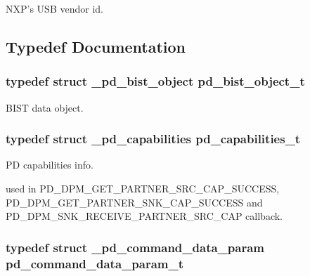 N\-X\-P's U\-S\-B vendor id. 



\subsection{Typedef Documentation}
\hypertarget{group__usb__pd__stack_ga812b5b90f650b07ee49c5ec4d2e24ebc}{
\subsubsection[{pd\-\_\-bist\-\_\-object\-\_\-t}]{\setlength{\rightskip}{0pt plus 5cm}typedef struct {\bf \-\_\-pd\-\_\-bist\-\_\-object}  {\bf pd\-\_\-bist\-\_\-object\-\_\-t}}}\label{group__usb__pd__stack_ga812b5b90f650b07ee49c5ec4d2e24ebc}


B\-I\-S\-T data object. 

\hypertarget{group__usb__pd__stack_ga1f893b05affdc0ac42173f4dfdfaa258}{
\subsubsection[{pd\-\_\-capabilities\-\_\-t}]{\setlength{\rightskip}{0pt plus 5cm}typedef struct {\bf \-\_\-pd\-\_\-capabilities}  {\bf pd\-\_\-capabilities\-\_\-t}}}\label{group__usb__pd__stack_ga1f893b05affdc0ac42173f4dfdfaa258}


P\-D capabilities info. 

used in P\-D\-\_\-\-D\-P\-M\-\_\-\-G\-E\-T\-\_\-\-P\-A\-R\-T\-N\-E\-R\-\_\-\-S\-R\-C\-\_\-\-C\-A\-P\-\_\-\-S\-U\-C\-C\-E\-S\-S, P\-D\-\_\-\-D\-P\-M\-\_\-\-G\-E\-T\-\_\-\-P\-A\-R\-T\-N\-E\-R\-\_\-\-S\-N\-K\-\_\-\-C\-A\-P\-\_\-\-S\-U\-C\-C\-E\-S\-S and P\-D\-\_\-\-D\-P\-M\-\_\-\-S\-N\-K\-\_\-\-R\-E\-C\-E\-I\-V\-E\-\_\-\-P\-A\-R\-T\-N\-E\-R\-\_\-\-S\-R\-C\-\_\-\-C\-A\-P callback. \hypertarget{group__usb__pd__stack_gac903dadc9a1dffbaac4f91f982a038de}{
\subsubsection[{pd\-\_\-command\-\_\-data\-\_\-param\-\_\-t}]{\setlength{\rightskip}{0pt plus 5cm}typedef struct {\bf \-\_\-pd\-\_\-command\-\_\-data\-\_\-param}  {\bf pd\-\_\-command\-\_\-data\-\_\-param\-\_\-t}}}\label{group__usb__pd__stack_gac903dadc9a1dffbaac4f91f982a038de}


